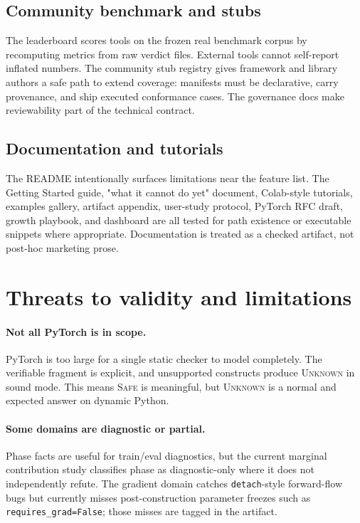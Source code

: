 \documentclass[11pt]{article}
\newcommand{\safe}{\textsc{Safe}}
\newcommand{\unknown}{\textsc{Unknown}}
\begin{document}
\subsection{Community benchmark and stubs}

The leaderboard scores tools on the frozen real benchmark corpus by recomputing
metrics from raw verdict files.  External tools cannot self-report inflated
numbers.  The community stub registry gives framework and library authors a
safe path to extend coverage: manifests must be declarative, carry provenance,
and ship executed conformance cases.  The governance docs make reviewability
part of the technical contract.

\subsection{Documentation and tutorials}

The README intentionally surfaces limitations near the feature list.  The
Getting Started guide, "what it cannot do yet" document, Colab-style tutorials,
examples gallery, artifact appendix, user-study protocol, PyTorch RFC draft,
growth playbook, and dashboard are all tested for path existence or executable
snippets where appropriate.  Documentation is treated as a checked artifact,
not post-hoc marketing prose.

\section{Threats to validity and limitations}

\paragraph{Not all PyTorch is in scope.}
PyTorch is too large for a single static checker to model completely.  The
verifiable fragment is explicit, and unsupported constructs produce \unknown{}
in sound mode.  This means \safe{} is meaningful, but \unknown{} is a normal and
expected answer on dynamic Python.

\paragraph{Some domains are diagnostic or partial.}
Phase facts are useful for train/eval diagnostics, but the current marginal
contribution study classifies phase as diagnostic-only where it does not
independently refute.  The gradient domain catches \texttt{detach}-style
forward-flow bugs but currently misses post-construction parameter freezes such
as \texttt{requires\_grad=False}; those misses are tagged in the artifact.
\end{document}
